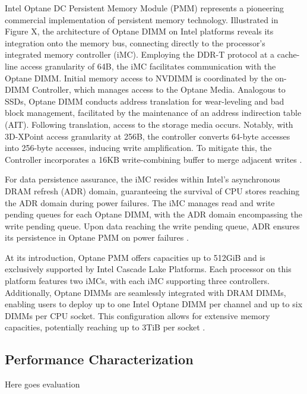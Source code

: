 Intel Optane DC Persistent Memory Module (PMM) represents a pioneering commercial implementation of persistent memory technology. Illustrated in Figure X, the architecture of Optane DIMM on Intel platforms reveals its integration onto the memory bus, connecting directly to the processor's integrated memory controller (iMC). Employing the DDR-T protocol at a cache-line access granularity of 64B, the iMC facilitates communication with the Optane DIMM. Initial memory access to NVDIMM is coordinated by the on-DIMM Controller, which manages access to the Optane Media. Analogous to SSDs, Optane DIMM conducts address translation for wear-leveling and bad block management, facilitated by the maintenance of an address indirection table (AIT). Following translation, access to the storage media occurs. Notably, with 3D-XPoint access granularity at 256B, the controller converts 64-byte accesses into 256-byte accesses, inducing write amplification. To mitigate this, the Controller incorporates a 16KB write-combining buffer to merge adjacent writes \cite{yang2020empirical,izraelevitz2019basic,wu2020ribbon}.

For data persistence assurance, the iMC resides within Intel's asynchronous DRAM refresh (ADR) domain, guaranteeing the survival of CPU stores reaching the ADR domain during power failures. The iMC manages read and write pending queues for each Optane DIMM, with the ADR domain encompassing the write pending queue. Upon data reaching the write pending queue, ADR ensures its persistence in Optane PMM on power failures \cite{yang2020empirical,izraelevitz2019basic,rudoff2017persistent}.

At its introduction, Optane PMM offers capacities up to 512GiB and is exclusively supported by Intel Cascade Lake Platforms. Each processor on this platform features two iMCs, with each iMC supporting three controllers. Additionally, Optane DIMMs are seamlessly integrated with DRAM DIMMs, enabling users to deploy up to one Intel Optane DIMM per channel and up to six DIMMs per CPU socket. This configuration allows for extensive memory capacities, potentially reaching up to 3TiB per socket \cite{yang2020empirical,izraelevitz2019basic}.

\subsection{Performance Characterization}
Here goes evaluation

